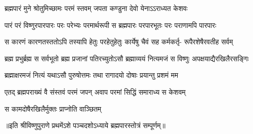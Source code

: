 
\addtocounter{shlokacount}{53}

\twolineshloka
{ब्रह्मपारं मुने श्रोतुमिच्छामः परमं स्तवम्}
{जपता कण्डुना देवो येनाऽऽराध्यत केशवः} %

\fourlineindentedshloka
{पारं परं विष्णुरपारपारः}
{परः परेभ्यः परमार्थरूपी}
{स ब्रह्मपारः परपारभूतः}
{परः पराणामपि पारपारः} %

\fourlineindentedshloka
{स कारणं कारणतस्ततोऽपि}
{तस्यापि हेतुः परहेतुहेतुः}
{कार्येषु चैवं सह कर्मकर्तृ-}
{रूपैरशेषैरवतीह सर्वम्} %

\fourlineindentedshloka
{ब्रह्म प्रभुर्ब्रह्म स सर्वभूतो}
{ब्रह्म प्रजानां पतिरच्युतोऽसौ}
{ब्रह्माव्ययं नित्यमजं स विष्णुः}
{अपक्षयाद्यैरखिलैरसङ्गिः} %

\twolineshloka
{ब्रह्माक्षरमजं नित्यं यथाऽसौ पुरुषोत्तमः}
{तथा रागादयो दोषाः प्रयान्तु प्रशमं मम} %

\twolineshloka
{एतद् ब्रह्मपराख्यं वै संस्तवं परमं जपन्}
{अवाप परमां सिद्धिं समाराध्य स केशवम्} %

{स कामदोषैरखिलैर्मुक्तः प्राप्नोति वाञ्छितम्} %

॥इति श्रीविष्णुपुराणे प्रथमेंऽशे पञ्चदशोऽध्याये ब्रह्मपारस्तोत्रं सम्पूर्णम्॥
